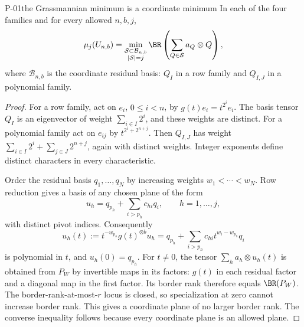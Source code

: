 \begin{finding}{P-01}{the Grassmannian minimum is a coordinate minimum}
In each of the four families and for every allowed \(n,b,j\),
\[
 \mu_j(U_{n,b})=
 \min_{\substack{\mathcal S\subset\mathcal B_{n,b}\\|\mathcal S|=j}}
 \BR\left(\sum_{Q\in\mathcal S}a_Q\otimes Q\right),
\]
where \(\mathcal B_{n,b}\) is the coordinate residual basis: \(Q_I\)
in a row family and \(Q_{I,J}\) in a polynomial family.
\end{finding}
\begin{proof}
For a row family, act on \(e_i\), \(0\leq i<n\), by
\(g(t)e_i=t^{2^i}e_i\). The basis tensor \(Q_I\) is an eigenvector
of weight \(\sum_{i\in I}2^i\), and these weights are distinct.
For a polynomial family act on \(e_{ij}\) by
\(t^{2^i+2^{n+j}}\). Then \(Q_{I,J}\) has weight
\(\sum_{i\in I}2^i+\sum_{j\in J}2^{n+j}\), again with distinct
weights. Integer exponents define distinct characters in every
characteristic.

Order the residual basis \(q_1,\ldots,q_N\) by increasing weights
\(w_1<\cdots<w_N\). Row reduction gives a basis of any chosen plane
of the form
\[
 u_h=q_{p_h}+\sum_{i>p_h}c_{hi}q_i,\qquad h=1,\ldots,j,
\]
with distinct pivot indices. Consequently
\[
 u_h(t):=t^{-w_{p_h}}g(t)^{\otimes b}u_h
 =q_{p_h}+\sum_{i>p_h}c_{hi}t^{w_i-w_{p_h}}q_i
\]
is polynomial in \(t\), and \(u_h(0)=q_{p_h}\).
For \(t\ne0\), the tensor \(\sum_h a_h\otimes u_h(t)\) is
obtained from \(P_W\) by invertible maps in its factors: \(g(t)\)
in each residual factor and a diagonal map in the first factor.
Its border rank therefore equals \(\BR(P_W)\).
The border-rank-at-most-\(r\) locus is closed, so specialization
at zero cannot increase border rank. This gives a coordinate plane
of no larger border rank. The converse inequality follows because
every coordinate plane is an allowed plane.
\end{proof}

